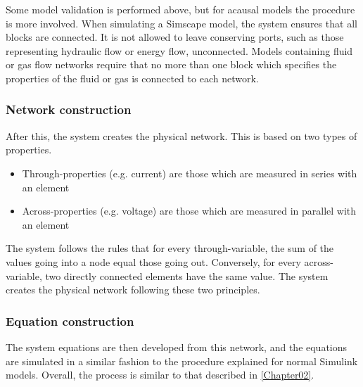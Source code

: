 \documentclass[\rootfolder/main.tex]{subfiles}
\begin{document}
Some model validation is performed above, but for acausal models the procedure is more involved.
When simulating a Simscape model, the system ensures that all blocks are connected.
It is not allowed to leave conserving ports, such as those representing hydraulic flow or energy flow, unconnected.
Models containing fluid or gas flow networks require that no more than one block which specifies the properties of the fluid or gas is connected to each network.

\subsubsection{Network construction}

After this, the system creates the physical network.
This is based on two types of properties.

\begin{itemize}
    \item Through-properties (e.g. current) are those which are measured in series with an element
    \item Across-properties (e.g. voltage) are those which are measured in parallel with an element
\end{itemize}

The system follows the rules that for every through-variable, the sum of the values going into a node equal those going out.
Conversely, for every across-variable, two directly connected elements have the same value.
The system creates the physical network following these two principles.

\subsubsection{Equation construction}

The system equations are then developed from this network, and the equations are simulated in a similar fashion to the procedure explained for normal Simulink models.
Overall, the process is similar to that described in \ref{Chapter02}.
\end{document}
